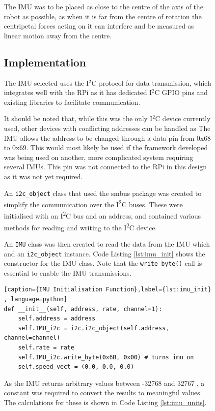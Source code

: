 \begin{figure}[!ht]
The IMU was to be placed as close to the centre of the axis of the robot as possible, as when it is far from the centre of rotation the centripetal forces acting on it can interfere and be measured as linear motion away from the centre.  

\subsection{Implementation}\label{elec/imu/impl}

The IMU selected uses the I$^2$C protocol for data transmission, which integrates well with the RPi as it has dedicated I$^2$C GPIO pins and existing libraries to facilitate communication. 

It should be noted that, while this was the only I$^2$C device currently used, other devices with conflicting addresses can be handled as The IMU allows the address to be changed through a data pin from 0x68 to 0x69. This would most likely be used if the framework developed was being used on another, more complicated system requiring several IMUs. This pin was not connected to the RPi in this design as it was not yet required. 

An \verb|i2c_object| class that used the smbus package was created to simplify the communication over the I\textsuperscript{2}C buses. These were initialised with an I\textsuperscript{2}C bus and an address, and contained various methods for reading and writing to the I\textsuperscript{2}C device. 


An \verb|IMU| class was then created to read the data from the IMU which and an \verb|i2c_object| instance. Code Listing \ref{lst:imu_init} shows the constructor for the IMU class. Note that the \verb|write_byte()| call is essential to enable the IMU transmissions. 

\begin{lstlisting}[caption={IMU Initialisation Function},label={lst:imu_init} , language=python]
def __init__(self, address, rate, channel=1):
    self.address = address
    self.IMU_i2c = i2c.i2c_object(self.address, channel=channel)
    self.rate = rate
    self.IMU_i2c.write_byte(0x6B, 0x00) # turns imu on
    self.speed_vect = (0.0, 0.0, 0.0)
\end{lstlisting}

As the IMU returns arbitrary values between -32768 and 32767 , a constant was required to convert the results to meaningful values. The calculations for these is shown in Code Listing \ref{lst:imu_units}. 


\end{figure}
